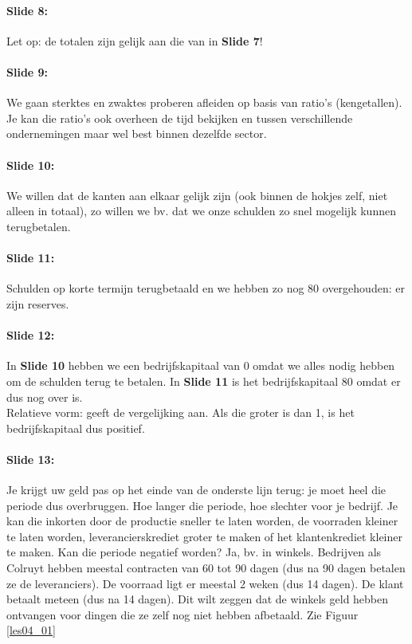 \documentclass[10pt,a4paper]{report}
\begin{document}
\paragraph{Slide 8:} Let op: de totalen zijn gelijk aan die van in \textbf{Slide 7}!

\paragraph{Slide 9:} We gaan sterktes en zwaktes proberen afleiden op basis van ratio's (kengetallen). Je kan die ratio's ook overheen de tijd bekijken en tussen verschillende ondernemingen maar wel best binnen dezelfde sector.

\paragraph{Slide 10:} We willen dat de kanten aan elkaar gelijk zijn (ook binnen de hokjes zelf, niet alleen in totaal), zo willen we bv. dat we onze schulden zo snel mogelijk kunnen terugbetalen. 

\paragraph{Slide 11:} Schulden op korte termijn terugbetaald en we hebben zo nog 80 overgehouden: er zijn reserves.

\paragraph{Slide 12:} In \textbf{Slide 10} hebben we een bedrijfskapitaal van 0 omdat we alles nodig hebben om de schulden terug te betalen. In \textbf{Slide 11} is het bedrijfskapitaal 80 omdat er dus nog over is.\\
Relatieve vorm: geeft de vergelijking aan. Als die groter is dan 1, is het bedrijfskapitaal dus positief.\\

\paragraph{Slide 13:} Je krijgt uw geld pas op het einde van de onderste lijn terug: je moet heel die periode dus overbruggen. Hoe langer die periode, hoe slechter voor je bedrijf. Je kan die inkorten door de productie sneller te laten worden, de voorraden kleiner te laten worden, leverancierskrediet groter te maken of het klantenkrediet kleiner te maken. Kan die periode negatief worden? Ja, bv. in winkels. Bedrijven als Colruyt hebben meestal contracten van 60 tot 90 dagen (dus na 90 dagen betalen ze de leveranciers). De voorraad ligt er meestal 2 weken (dus 14 dagen). De klant betaalt meteen (dus na 14 dagen). Dit wilt zeggen dat de winkels geld hebben ontvangen voor dingen die ze zelf nog niet hebben afbetaald. Zie Figuur \ref{les04_01}
\end{document}
